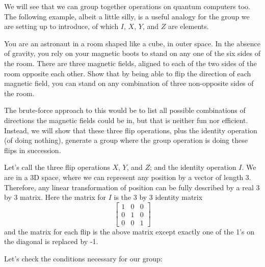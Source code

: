 \documentclass{article}
\theoremstyle{definition}
\begin{document}
We will see that we can group together operations on quantum computers too.  The following example, albeit a little silly, is a useful analogy for the group we are setting up to introduce, of which $I$, $X$, $Y$, and $Z$ are elements.

\begin{example}
	\label{ex:groupfirstex}
	You are an astronaut in a room shaped like a cube, in outer space.  In the absence of gravity, you rely on your magnetic boots to stand on any one of the six sides of the room.  There are three magnetic fields, aligned to each of the two sides of the room opposite each other.  Show that by being able to flip the direction of each magnetic field, you can stand on any combination of three non-opposite sides of the room.
	
	\textnormal{The brute-force approach to this would be to list all possible combinations of directions the magnetic fields could be in, but that is neither fun nor efficient.  Instead, we will show that these three flip operations, plus the identity operation (of doing nothing), generate a group where the group operation is doing these flips in succession.}
	
	\textnormal{Let's call the three flip operations $X$, $Y$, and $Z$; and the identity operation $I$.  We are in a 3D space, where we can represent any position by a vector of length 3.  Therefore, any linear transformation of position can be fully described by a real 3 by 3 matrix.  Here the matrix for $I$ is the 3 by 3 identity matrix}
	\begin{equation*}
		\begin{bmatrix}
			1 & 0 & 0\\
			0 & 1 & 0\\
			0 & 0 & 1
		\end{bmatrix}
	\end{equation*}	
	\textnormal{and the matrix for each flip is the above matrix except exactly one of the 1's on the diagonal is replaced by -1.}
	
	\textnormal{Let's check the conditions necessary for our group:}


\end{example}
\end{document}

